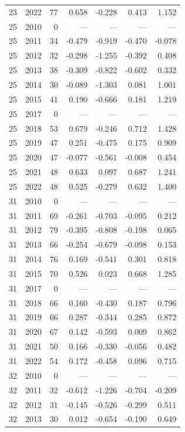 \begin{longtable}{llrrrrr}
23 & 2022 & 77 & 0.658 & -0.228 & 0.413 & 1.152 \\
25 & 2010 & 0 & --- & --- & --- & --- \\
25 & 2011 & 34 & -0.479 & -0.919 & -0.470 & -0.078 \\
25 & 2012 & 32 & -0.298 & -1.255 & -0.392 & 0.408 \\
25 & 2013 & 38 & -0.309 & -0.822 & -0.602 & 0.332 \\
25 & 2014 & 30 & -0.089 & -1.303 & 0.081 & 1.001 \\
25 & 2015 & 41 & 0.190 & -0.666 & 0.181 & 1.219 \\
25 & 2017 & 0 & --- & --- & --- & --- \\
25 & 2018 & 53 & 0.679 & -0.246 & 0.712 & 1.428 \\
25 & 2019 & 47 & 0.251 & -0.475 & 0.175 & 0.909 \\
25 & 2020 & 47 & -0.077 & -0.561 & -0.008 & 0.454 \\
25 & 2021 & 48 & 0.633 & 0.097 & 0.687 & 1.241 \\
25 & 2022 & 48 & 0.525 & -0.279 & 0.632 & 1.400 \\
31 & 2010 & 0 & --- & --- & --- & --- \\
31 & 2011 & 69 & -0.261 & -0.703 & -0.095 & 0.212 \\
31 & 2012 & 79 & -0.395 & -0.808 & -0.198 & 0.065 \\
31 & 2013 & 66 & -0.254 & -0.679 & -0.098 & 0.153 \\
31 & 2014 & 76 & 0.169 & -0.541 & 0.301 & 0.818 \\
31 & 2015 & 70 & 0.526 & 0.023 & 0.668 & 1.285 \\
31 & 2017 & 0 & --- & --- & --- & --- \\
31 & 2018 & 66 & 0.160 & -0.430 & 0.187 & 0.796 \\
31 & 2019 & 66 & 0.287 & -0.344 & 0.285 & 0.872 \\
31 & 2020 & 67 & 0.142 & -0.593 & 0.009 & 0.862 \\
31 & 2021 & 50 & 0.166 & -0.330 & -0.056 & 0.482 \\
31 & 2022 & 54 & 0.172 & -0.458 & 0.096 & 0.715 \\
32 & 2010 & 0 & --- & --- & --- & --- \\
32 & 2011 & 32 & -0.612 & -1.226 & -0.704 & -0.209 \\
32 & 2012 & 31 & -0.145 & -0.526 & -0.299 & 0.511 \\
32 & 2013 & 30 & 0.012 & -0.654 & -0.190 & 0.649 \\

\end{longtable}
